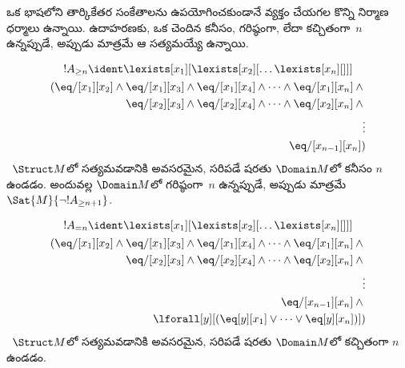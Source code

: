 \documentclass[../../../include/open-logic-section]{subfiles}
\begin{document}


\begin{explain}
ఒక భాషలోని తార్కికేతర సంకేతాలను ఉపయోగించకుండానే వ్యక్తం చేయగల కొన్ని
నిర్మాణ ధర్మాలు ఉన్నాయి. ఉదాహరణకు, ఒక  చెందిన 
కనీసం, గరిష్ఠంగా, లేదా కచ్చితంగా~$n$ 
ఉన్నప్పుడే, అప్పుడు మాత్రమే ఆ  సత్యమయ్యే  ఉన్నాయి.
\end{explain}

\begin{prop}
\begin{multline*}
  !A_{\ge n} \ident \lexists[x_1][\lexists[x_2][\dots\lexists[x_n][{}]]]\\
  \begin{aligned}
  (\eq/[x_1][x_2] \land {}
  \eq/[x_1][x_3] \land \eq/[x_1][x_4] \land \dots \land \eq/[x_1][x_n] \land {}\\
\eq/[x_2][x_3] \land \eq/[x_2][x_4] \land \dots \land {} \eq/[x_2][x_n] \land {} \\
\vdots\\
\eq/[x_{n-1}][x_n])
\end{aligned}
\end{multline*}
~$\Struct M$లో సత్యమవడానికి అవసరమైన, సరిపడే షరతు $\Domain M$లో కనీసం
$n$  ఉండడం. అందువల్ల
$\Domain M$లో గరిష్ఠంగా~$n$  ఉన్నప్పుడే, అప్పుడు మాత్రమే
$\Sat{M}{\lnot !A_{\ge n+1}}$.

\end{prop}

\begin{prop}
\begin{multline*}
!A_{= n} \ident \lexists[x_1][\lexists[x_2][\dots\lexists[x_n][{}]]] \\
\begin{aligned}
  (\eq/[x_1][x_2] \land {}
  \eq/[x_1][x_3] \land \eq/[x_1][x_4] \land \dots \land \eq/[x_1][x_n] \land {}\\
\eq/[x_2][x_3] \land \eq/[x_2][x_4] \land \dots \land {} \eq/[x_2][x_n] \land {} \\
\vdots\\
\eq/[x_{n-1}][x_n] \land {} \\
\lforall[y][(\eq[y][x_1] \lor \dots \lor \eq[y][x_n])])
\end{aligned}
\end{multline*}
~$\Struct M$లో సత్యమవడానికి అవసరమైన, సరిపడే షరతు $\Domain M$లో కచ్చితంగా
$n$  ఉండడం.
\end{prop}
\end{document}
